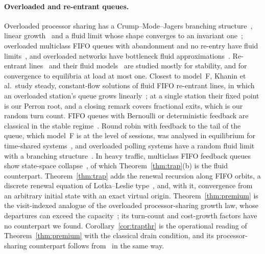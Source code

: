 \paragraph{Overloaded and re-entrant queues.} Overloaded processor sharing has a Crump--Mode--Jagers branching
structure~\citep{grishechkin1992processor}, linear growth~\citep{jeanmarie1994transient} and a fluid limit whose shape converges to an
invariant one~\citep{puha2006overloaded}; overloaded multiclass FIFO queues with abandonment and no re-entry have fluid
limits~\citep{jennings2013fluid}, and overloaded networks have bottleneck fluid approximations~\citep{chen1991discrete}. Re-entrant
lines~\citep{kumar1993reentrant} and their fluid models~\citep{dai1996stability,bramson1996convergence} are studied mostly for
stability, and for convergence to equilibria at load at most one. Closest to model~F, Khanin et al.\ study steady, constant-flow solutions of fluid FIFO re-entrant lines,
in which an overloaded station's queue grows linearly~\citep{khanin2001steady}; at a single station their fixed point is our Perron
root, and a closing remark covers fractional exits, which is our random turn count. FIFO queues with Bernoulli or deterministic
feedback are classical in the stable regime~\citep{takacs1963feedback,vandenberg1989deterministic}. Round robin with feedback
to the tail of the queue, which model~F is at the level of sessions, was analysed in equilibrium for time-shared
systems~\citep{kleinrock1967timeshared,coffman1968feedback}, and overloaded polling systems have a random fluid limit with a branching
structure~\citep{remerova2014random}. In heavy traffic, multiclass FIFO feedback queues show state-space collapse~\citep{reiman1988multiclass,dai1995multiclass}, of
which Theorem~\ref{thm:trap}(b) is the fluid counterpart. Theorem~\ref{thm:trap} adds the renewal recursion along FIFO orbits, a
discrete renewal equation of Lotka--Leslie type~\citep{feller1968introduction}, and, with it, convergence from an arbitrary initial
state with an exact virtual origin. Theorem~\ref{thm:premium} is the visit-indexed analogue of the overloaded processor-sharing growth
law, whose departures can exceed the capacity~\citep{jeanmarie1994transient}; its turn-count and cost-growth factors have no
counterpart we found. Corollary~\ref{cor:trapthr} is the operational reading of Theorem~\ref{thm:premium} with the classical drain
condition, and its processor-sharing counterpart follows from~\citep{jeanmarie1994transient} in the same way.

